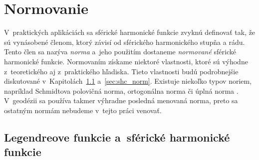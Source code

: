 \documentclass[a4paper,12pt]{book}
\begin{document}
\section{Normovanie}
\label{sec:normalization}

V~praktických aplikáciách sa sférické harmonické funkcie zvyknú definovať tak, 
že sú vynásobené členom, ktorý závisí od sférického harmonického stupňa a rádu.  
Tento člen sa nazýva \emph{norma} a~jeho použitím dostaneme \emph{normované} 
sférické harmonické funkcie.  Normovaním získame niektoré vlastnosti, ktoré sú 
výhodne z~teoretického aj z~praktického hľadiska.  Tieto vlastnosti budú 
podrobnejšie diskutované v~Kapitolách~\ref{sec:leg_sh_norm} 
a~\ref{sec:shc_norm}.  Existuje niekoľko typov noriem, napríklad Schmidtova 
polovičná norma, ortogonálna norma či úplná norma \parencite{SHTOOLS}.  
V~geodézii sa používa takmer výhradne posledná menovaná norma, preto sa 
ostatným normám nebudeme v~tejto práci venovať.

\subsection{Legendreove funkcie a~sférické harmonické funkcie}
\label{sec:leg_sh_norm}
\end{document}
